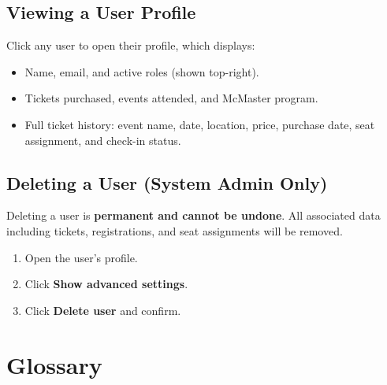\documentclass[12pt, twoside]{report}
\newcommand{\uielem}[1]{\textbf{#1}}
\begin{document}
\section{Viewing a User Profile}

Click any user to open their profile, which displays:

\begin{itemize}
  \item Name, email, and active roles (shown top-right).
  \item Tickets purchased, events attended, and McMaster program.
  \item Full ticket history: event name, date, location, price, purchase
        date, seat assignment, and check-in status.
\end{itemize}

\section{Deleting a User (System Admin Only)}

\begin{warnbox}
Deleting a user is \textbf{permanent and cannot be undone}. All associated
data including tickets, registrations, and seat assignments will be removed.
\end{warnbox}

\begin{enumerate}
  \item Open the user's profile.
  \item Click \uielem{Show advanced settings}.
  \item Click \uielem{Delete user} and confirm.
\end{enumerate}



\chapter{Glossary}
\end{document}
